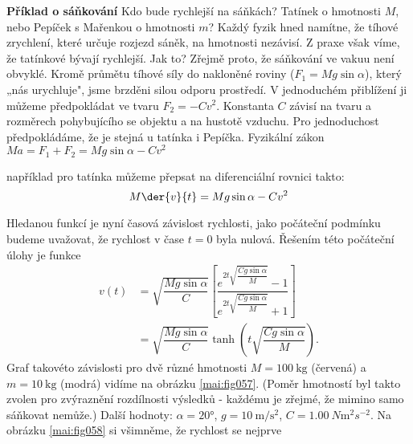 \begin{mdframed}[style=mdexam]
  \begin{example}\label{mai:exam086}
    \textbf{Příklad o sáňkování}\newline
    Kdo bude rychlejší na sáňkách? Tatínek o hmotnosti \(M\), nebo Pepíček s Mařenkou o hmotnosti
    \(m\)? Každý fyzik hned namítne, že tíhové zrychlení, které určuje rozjezd sáněk, na hmotnosti
    nezávisí. Z praxe však víme, že tatínkové bývají rychlejší. Jak to? Zřejmě proto, že sáňkování
    ve vakuu není obvyklé. Kromě průmětu tíhové síly do nakloněné roviny (\(F_1 = Mg\sin\alpha\)),
    který „nás urychluje", jsme brzděni silou odporu prostředí. V jednoduchém přiblížení ji můžeme
    předpokládat ve tvaru \(F_2 = -Cv^2\). Konstanta \(C\) závisí na tvaru a rozměrech pohybujícího
    se objektu a na hustotě vzduchu. Pro jednoduchost předpokládáme, že je stejná u tatínka i
    Pepíčka. Fyzikální zákon \(Ma= F_1 + F_2 = Mg\sin\alpha - Cv^2\)

    {\centering
    \captionsetup{type=figure}
    \label{mai:fig057}
    \par}

    například pro tatínka můžeme přepsat na diferenciální rovnici takto:
    \begin{equation}\label{mai:eq079}
      M\der{v}{t} = Mg\sin\alpha - Cv^2
    \end{equation}
    
    Hledanou funkcí je nyní časová závislost rychlosti, jako počáteční podmínku budeme uvažovat, že
    rychlost v čase \(t = 0\) byla nulová. Řešením této počáteční úlohy je funkce
    \begin{align*}
      v(t) &= \sqrt{\dfrac{Mg\sin\alpha}{C}}
              \left[\dfrac{e^{2t\sqrt{\dfrac{Cg\sin\alpha}{M}}}-1}
                          {e^{2t\sqrt{\dfrac{Cg\sin\alpha}{M}}}+1}
              \right]                                                                           \\
          &= \sqrt{\dfrac{Mg\sin\alpha}{C}}\tanh\left(t\sqrt{\dfrac{Cg\sin\alpha}{M}}\right).
    \end{align*}
    Graf takovéto závislosti pro dvě různé hmotnosti \(M = \qty{100}{\kg}\) (červená) a \(m =\qty{10}
    {\kg}\) (modrá) vidíme na obrázku \ref{mai:fig057}. (Poměr hmotností byl takto zvolen pro
    zvýraznění rozdílnosti výsledků - každému je zřejmé, že mimino samo sáňkovat nemůže.) Další
    hodnoty: \(\alpha = \ang{20}\), \(g = \qty{10}{\m\per\square\s}\), \(C =
    \qty{1.00}{N\m^2s^{-2}}\). Na obrázku \ref{mai:fig058} si všimněme, že rychlost se nejprve


\end{example}
\end{mdframed}
